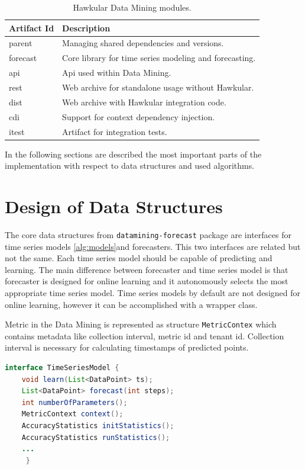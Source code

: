 \begin{table}[h]
    \begin{center}
        \begin{tabular}{l|l}
            \textbf{Artifact Id} & \textbf{Description} \\ \hline \hline
            parent & Managing shared dependencies and versions. \\
            forecast & Core library for time series modeling and forecasting. \\
            api & Api used within Data Mining. \\
            rest & Web archive for standalone usage without Hawkular. \\
            dist & Web archive with Hawkular integration code. \\
            cdi & Support for context dependency injection. \\
            itest & Artifact for integration tests.
        \end{tabular}
        \caption{Hawkular Data Mining modules.}
        \label{tab:datamining-modules}
    \end{center}
\end{table}

In the following sections are described the most important parts of the implementation with respect to data structures
and used algorithms.

    \section{Design of Data Structures}
    The core data structures from \texttt{datamining-forecast} package are interfaces for time series models
    \ref{alg:models}and forecasters. This two interfaces are related but not the same. Each time series model should be capable of
    predicting and learning. The main difference between forecaster and time series model is that forecaster
    is designed for online learning and it autonomously selects the most appropriate time series model. Time series
    models by default are not designed for online learning, however it can be accomplished with a wrapper class.

    Metric in the Data Mining is represented as structure \texttt{MetricContex} which contains metadata like
    collection interval, metric id and tenant id. Collection interval is necessary for calculating timestamps of
    predicted points.

    \begin{lstlisting}[caption={Interface for time series models.}, language=Java, label={alg:models}]
interface TimeSeriesModel {
    void learn(List<DataPoint> ts);
    List<DataPoint> forecast(int steps);
    int numberOfParameters();
    MetricContext context();
    AccuracyStatistics initStatistics();
    AccuracyStatistics runStatistics();
    ...
     }
    \end{lstlisting}

